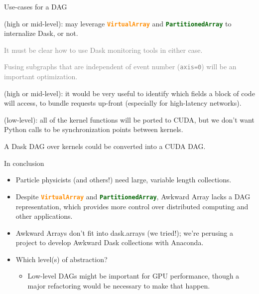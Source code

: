 \documentclass[aspectratio=169]{beamer}
\begin{document}
\begin{frame}{Use-cases for a DAG}
\large
\vspace{0.3 cm}
\begin{description}\setlength{\itemsep}{0.25 cm}
\item[\bf Distributed computing] (high or mid-level): may leverage \textcolor{darkorange}{\tt\textbf{VirtualArray}} and \textcolor{darkgreen}{\tt\textbf{PartitionedArray}} to internalize Dask, or not.

\vspace{0.2 cm}
\textcolor{gray}{It must be clear how to use Dask monitoring tools in either case.}

\vspace{0.2 cm}
\textcolor{gray}{Fusing subgraphs that are independent of event number ({\tt axis=0}) will be an important optimization.}

\item[\bf Static analysis] (high or mid-level): it would be very useful to identify which fields a block of code will access, to bundle requests up-front (especially for high-latency networks).

\item[\bf Streamlining GPU code] (low-level): all of the kernel functions will be ported to CUDA, but we don't want Python calls to be synchronization points between kernels.

\vspace{0.2 cm}
A Dask DAG over kernels could be converted into a CUDA DAG.
\end{description}
\end{frame}

\begin{frame}{In conclusion}
\large
\vspace{0.5 cm}
\begin{itemize}\setlength{\itemsep}{0.5 cm}
\item Particle physicists (and others!) need large, variable length collections.

\item Despite \textcolor{darkorange}{\tt\textbf{VirtualArray}} and \textcolor{darkgreen}{\tt\textbf{PartitionedArray}}, Awkward Array lacks a DAG representation, which provides more control over distributed computing and other applications.

\item Awkward Arrays don't fit into dask.arrays (we tried!); we're perusing a project to develop Awkward Dask collections with Anaconda.

\item Which level(s) of abstraction?

\begin{itemize}
\item Low-level DAGs might be important for GPU performance, though a major refactoring would be necessary to make that happen.
\end{itemize}
\end{itemize}
\end{frame}
\end{document}
